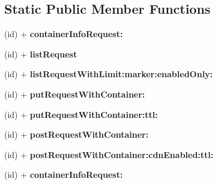 \subsection*{\-Static \-Public \-Member \-Functions}
\begin{DoxyCompactItemize}
\item 
\hypertarget{interface_a_s_i_cloud_files_c_d_n_request_a7530647efafef518b550f6390b6b4c30}{
(id) + {\bfseries container\-Info\-Request\-:}}
\label{interface_a_s_i_cloud_files_c_d_n_request_a7530647efafef518b550f6390b6b4c30}

\item 
\hypertarget{interface_a_s_i_cloud_files_c_d_n_request_a9d7f472b708be8a5bbff26ecf72ca0e7}{
(id) + {\bfseries list\-Request}}
\label{interface_a_s_i_cloud_files_c_d_n_request_a9d7f472b708be8a5bbff26ecf72ca0e7}

\item 
\hypertarget{interface_a_s_i_cloud_files_c_d_n_request_a3acbf036c7e416c2b6f66ac6be6a9617}{
(id) + {\bfseries list\-Request\-With\-Limit\-:marker\-:enabled\-Only\-:}}
\label{interface_a_s_i_cloud_files_c_d_n_request_a3acbf036c7e416c2b6f66ac6be6a9617}

\item 
\hypertarget{interface_a_s_i_cloud_files_c_d_n_request_a92d1b9ce687974a8ffab0b026a39eb28}{
(id) + {\bfseries put\-Request\-With\-Container\-:}}
\label{interface_a_s_i_cloud_files_c_d_n_request_a92d1b9ce687974a8ffab0b026a39eb28}

\item 
\hypertarget{interface_a_s_i_cloud_files_c_d_n_request_ab7db6c10a48bfb16bdae65e5d7740148}{
(id) + {\bfseries put\-Request\-With\-Container\-:ttl\-:}}
\label{interface_a_s_i_cloud_files_c_d_n_request_ab7db6c10a48bfb16bdae65e5d7740148}

\item 
\hypertarget{interface_a_s_i_cloud_files_c_d_n_request_aa201c29194b1b8465c6b45a582904573}{
(id) + {\bfseries post\-Request\-With\-Container\-:}}
\label{interface_a_s_i_cloud_files_c_d_n_request_aa201c29194b1b8465c6b45a582904573}

\item 
\hypertarget{interface_a_s_i_cloud_files_c_d_n_request_adc0b232663fe13af064f00522d6da305}{
(id) + {\bfseries post\-Request\-With\-Container\-:cdn\-Enabled\-:ttl\-:}}
\label{interface_a_s_i_cloud_files_c_d_n_request_adc0b232663fe13af064f00522d6da305}

\item 
\hypertarget{interface_a_s_i_cloud_files_c_d_n_request_a7530647efafef518b550f6390b6b4c30}{
(id) + {\bfseries container\-Info\-Request\-:}}
\label{interface_a_s_i_cloud_files_c_d_n_request_a7530647efafef518b550f6390b6b4c30}


\end{DoxyCompactItemize}
